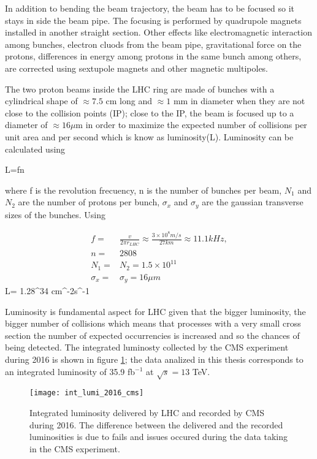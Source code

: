\noindent In addition to bending the beam trajectory, the beam has to be focused so it stays in side the beam pipe. The focusing is performed by quadrupole magnets installed in another straight section. Other effects like electromagnetic interaction among bunches, electron cluods from the beam pipe, gravitational force on the protons, differences in energy among protons in the same bunch among others, are corrected using sextupole magnets and other magnetic multipoles.     

\noindent The two proton beams inside the LHC ring are made of bunches with a cylindrical shape of $\approx 7.5$ cm long and $\approx 1$ mm in diameter when they are not close to the collision points (IP); close to the IP, the beam is focused up to a diameter of $\approx 16 \mu$m in order to maximize the expected number of collisions per unit area and per second which is know as luminosity(L). Luminosity can be calculated using

\beqn
L=fn
\eeqn

\noindent where f is the revolution frecuency, n is the number of bunches per beam,  $N_1$ and $N_2$ are the number of protons per bunch,  $\sigma_x$ and $\sigma_y$ are the gaussian transverse sizes of the bunches. Using

\begin{align}
  f=&\frac{v}{2\pi r_{LHC}}\approx\frac{3\times10^8m/s}{27km}\approx 11.1 kHz,\nonumber \\
  n=&2808\nonumber \\ 
  N_1=&N_2=1.5\times 10^{11}\nonumber\\
  \sigma_x=&\sigma_y=16\mu m\nonumber
\end{align}
\beqn
L= 1.28^{34} cm^{-2}s^{-1}
\eeqn

\noindent Luminosity is fundamental aspect for LHC given that the bigger luminosity, the bigger number of collisions which means that processes with a very small cross section the number of expected occurrencies is increased and so the chances of being detected. The integrated luminosty collected by the CMS experiment during 2016 is shown in figure \ref{fig:lumi}; the data analized in this thesis corresponds to an integrated luminosity of 35.9 fb$^{-1}$ at $\sqrt{s}=13$ TeV.   

\begin{figure}[!h]
\centering
\texttt{[image: int\_lumi\_2016\_cms]}
\caption [2016 CMS Integrated luminosity]{Integrated luminosity delivered by LHC and recorded by CMS during 2016. The difference between the delivered and the recorded luminosities is due to fails and issues occured during the data taking in the CMS experiment\cite{lumi}.}\label{fig:lumi}
\end{figure}

